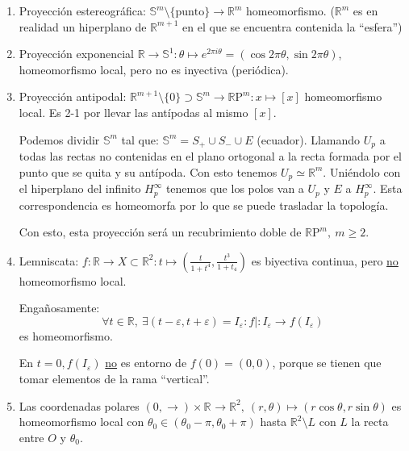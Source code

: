\begin{ej}[¡Importantes!]
\begin{enumerate}
    \item Proyección estereográfica: $\mathbb{S}^{m} \setminus \{\text{punto}\} \rightarrow \mathbb{R}^m$ homeomorfismo. ($\mathbb{R}^{m}$ es en realidad un hiperplano de $\mathbb{R}^{m+1}$ en el que se encuentra contenida la ``esfera'')

    \item Proyección exponencial $\mathbb{R} \rightarrow \mathbb{S}^1: \theta \mapsto e^{2\pi i\theta} = \left( \cos 2\pi \theta, \sin 2\pi \theta \right)$, homeomorfismo local, pero no es inyectiva (periódica).

    \item Proyección antipodal: $\mathbb{R}^{m+1}\setminus \{0\} \supset \mathbb{S}^m \rightarrow \mathbb{R}\mathrm{P}^{m}: x \mapsto \left[ x \right]$ homeomorfismo local. Es 2-1 por llevar las antípodas al mismo $\left[ x \right]$. 

    Podemos dividir $\mathbb{S}^{m}$ tal que: $\mathbb{S}^{m} = S_{+} \cup S_{-} \cup E$ (ecuador). Llamando $U_p$ a todas las rectas no contenidas en el plano ortogonal a la recta formada por el punto que se quita y su antípoda. Con esto tenemos $U_p \simeq \mathbb{R}^{m}$. Uniéndolo con el hiperplano del infinito $H_p^{\infty}$ tenemos que los polos van a $U_p$ y $E$ a $H_p^{\infty}$. Esta correspondencia es homeomorfa por lo que se puede trasladar la topología.

    Con esto, esta proyección será un recubrimiento doble de $\mathbb{R}\mathrm{P}^m,\ m \ge 2$.

    \item Lemniscata: $f: \mathbb{R} \rightarrow X \subset \mathbb{R}^2: t \mapsto \left( \frac{t}{1 + t^4}, \frac{t^3}{1 + t_4} \right)$ es biyectiva continua, pero \underline{no} homeomorfismo local.

    Engañosamente: 
    \[
        \forall t \in \mathbb{R},\ \exists \left( t - \varepsilon, t + \varepsilon \right) = I_{\varepsilon}: f| : I_{\varepsilon} \rightarrow f\left( I_{\varepsilon} \right) 
    \]
    es homeomorfismo.

    En $t = 0, f\left( I_{\varepsilon} \right)$ \underline{no} es entorno de $f\left( 0 \right) = \left( 0, 0 \right)$, porque se tienen que tomar elementos de la rama ``vertical''.

    \item Las coordenadas polares $\left( 0, \rightarrow \right) \times \mathbb{R}^{} \rightarrow \mathbb{R}^{2},\ \left( r, \theta \right) \mapsto \left( r\cos \theta, r \sin \theta \right)$ es homeomorfismo local con $\theta_0 \in \left( \theta_0 - \pi, \theta_0 + \pi \right)$ hasta $\mathbb{R}^{2} \setminus L$ con $L$ la recta entre $O$ y $\theta_0$.
\end{enumerate} 
\end{ej}

